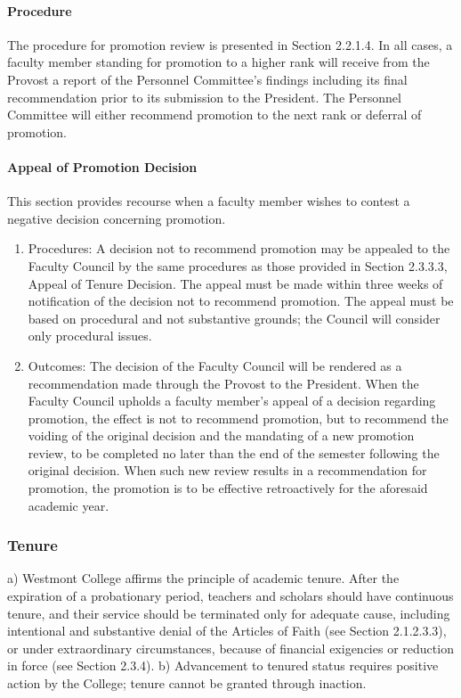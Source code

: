 \documentclass[letterpaper, 11pt]{article}
\begin{document}
			\paragraph{Procedure}
				The procedure for promotion review is presented in Section 2.2.1.4.  In all cases, a faculty member standing for promotion to a higher rank will receive from the Provost a report of the Personnel Committee's findings including its final recommendation prior to its submission to the President.  The Personnel Committee will either recommend promotion to the next rank or deferral of promotion.
			\paragraph{Appeal of Promotion Decision}
				This section provides recourse when a faculty member wishes to contest a negative decision concerning promotion.
				\begin{enumerate}[label=\alph*)]
					\item{Procedures:}
					A decision not to recommend promotion may be appealed to the Faculty Council by the same procedures as those provided in Section 2.3.3.3, Appeal of Tenure Decision. The appeal must be made within three weeks of notification of the decision not to recommend promotion. The appeal must be based on procedural and not substantive grounds; the Council will consider only procedural issues.
					\item{Outcomes:}
					The decision of the Faculty Council will be rendered as a recommendation made through the Provost to the President. When the Faculty Council upholds a faculty member's appeal of a decision regarding promotion, the effect is not to recommend promotion, but to recommend the voiding of the original decision and the mandating of a new promotion review, to be completed no later than the end of the semester following the original decision.  When such new review results in a recommendation for promotion, the promotion is to be effective retroactively for the aforesaid academic year.
				\end{enumerate}
		\subsubsection{Tenure}
			a) Westmont College affirms the principle of academic tenure.  After the expiration of a probationary period, teachers and scholars should have continuous tenure, and their service should be terminated only for adequate cause, including intentional and substantive denial of the Articles of Faith (see Section 2.1.2.3.3), or under extraordinary circumstances, because of financial exigencies or reduction in force (see Section 2.3.4).
			b) Advancement to tenured status requires positive action by the College; tenure cannot be granted through inaction.
\end{document}
